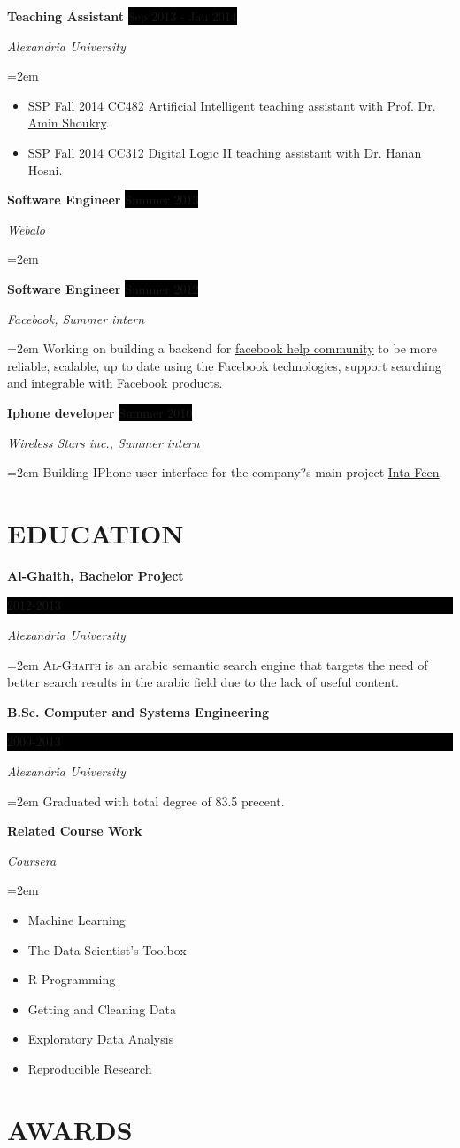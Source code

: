 \documentclass[paper=a4,fontsize=11pt]{scrartcl} %
\newcommand{\NewPart}[1]{\section*{\uppercase{#1}}}
\newcommand{\EducationEntry}[4]{
		\noindent \textbf{#1} \hfill      %
		\colorbox{Black}{%
			\parbox{6em}{%
			\hfill\color{White}#2}} \par  %
		\noindent \textit{#3} \par        %
		\noindent\hangindent=2em\hangafter=0 \small #4 %
		\normalsize \par}
\newcommand{\CourseEntry}[3]{
		\noindent \textbf{#1} \par  %
		\noindent \textit{#2} \par        %
		\hangindent=2em\hangafter=0 \small #3 %
		\normalsize \par}
\newcommand{\WorkEntry}[4]{				  %
		\noindent \textbf{#1} \hfill      %
		\colorbox{Black}{\color{White}#2} \par  %
		\noindent \textit{#3} \par              %
		\noindent\hangindent=2em\hangafter=0 \small #4 %
		\normalsize \par}
\begin{document}
	\WorkEntry{Teaching Assistant}{Sep 2013 - Jan 2014}{Alexandria University}{
	\begin{itemize}
	 	\item SSP Fall 2014 CC482 Artificial Intelligent teaching assistant with \href{http://scholar.google.com/citations?user=z10Zl1kAAAAJ&hl=en}{Prof. Dr. Amin Shoukry}.
		\item SSP Fall 2014 CC312 Digital Logic II teaching assistant with Dr. Hanan Hosni.
	\end{itemize}}

	\WorkEntry{Software Engineer}{Summer 2013}{Webalo}{}

	\WorkEntry{Software Engineer}{Summer 2012}{Facebook, Summer intern}{Working on building a backend for \href{https://www.facebook.com/help/community}{facebook help community} to be more reliable, scalable, up to date using the Facebook technologies, support searching and integrable with Facebook products.}

	\WorkEntry{Iphone developer}{Summer 2010}{Wireless Stars inc., Summer intern}{Building IPhone user interface for the company?s main project \href{http://www.intafeen.com/}{Inta Feen}.}


\NewPart{Education}{}

	\EducationEntry{Al-Ghaith, Bachelor Project}{2012-2013}{Alexandria University}{\textsc{Al-Ghaith} is an arabic semantic search engine that targets the need of better search results in the arabic field due to the lack of useful content.}

	\EducationEntry{B.Sc. Computer and Systems Engineering}{2009-2013}{Alexandria University}{Graduated with total degree of 83.5 precent.}
	
	\CourseEntry{Related Course Work}{Coursera}{
		\begin{multicols}{2}
		\begin{itemize}
			\item Machine Learning
			\item The Data Scientist's Toolbox
			\item R Programming
			\item Getting and Cleaning Data
			\item Exploratory Data Analysis
			\item Reproducible Research
		\end{itemize}
		\end{multicols}
	}


\NewPart{Awards}{}
\end{document}
